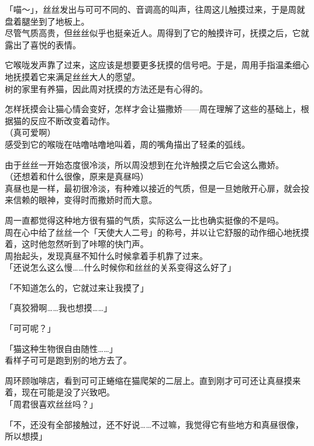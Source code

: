 「喵～」，丝丝发出与可可不同的、音调高的叫声，往周这儿触摸过来，于是周就盘着腿坐到了地板上。\\

尽管气质高贵，但丝丝似乎也挺亲近人。周得到了它的触摸许可，抚摸之后，它就露出了喜悦的表情。

它喉咙发声靠了过来，这应该是想要更多抚摸的信号吧。于是，周用手指温柔细心地抚摸着它来满足丝丝大人的愿望。\\

树的家里有养猫，因此周对抚摸的方法还是有心得的。

怎样抚摸会让猫心情会变好，怎样才会让猫撒娇——周在理解了这些的基础上，根据猫的反应不断改变着动作。\\

（真可爱啊）\\

感受到它的喉咙在咕噜咕噜地叫着，周的嘴角描出了轻柔的弧线。

由于丝丝一开始态度很冷淡，所以周没想到在允许触摸之后它会这么撒娇。\\

（还想着和什么很像，原来是真昼吗）\\

真昼也是一样，最初很冷淡，有种难以接近的气质，但是一旦她敞开心扉，就会投来信赖的眼神，变得时而撒娇时而大意。

周一直都觉得这种地方很有猫的气质，实际这么一比也确实挺像的不是吗。\\

周在心中给了丝丝一个「天使大人二号」的称号，并以让它舒服的动作细心地抚摸着，这时他忽然听到了咔嚓的快门声。\\

周抬起头，发现真昼不知什么时候拿着手机靠了过来。\\

「还说怎么这么慢……什么时候你和丝丝的关系变得这么好了」

「不知道怎么的，它就过来让我摸了」

「真狡猾啊……我也想摸……」

「可可呢？」

「猫这种生物很自由随性……」\\

看样子可可是跑到别的地方去了。

周环顾咖啡店，看到可可正蜷缩在猫爬架的二层上。直到刚才可可还让真昼摸来着，现在可能是没了兴致吧。\\

「周君很喜欢丝丝吗？」

「不，还没有全部接触过，还不好说……不过嘛，我觉得它有些地方和真昼很像，所以想摸」


